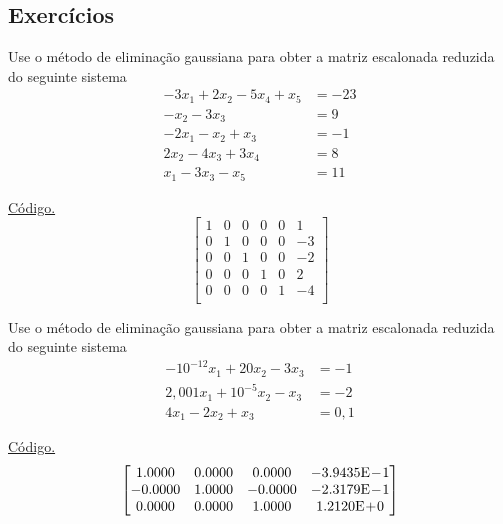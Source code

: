 \subsection*{Exercícios}

\begin{exer}\label{exer:egauss_reduzida}
  Use o método de eliminação gaussiana para obter a matriz escalonada reduzida do seguinte sistema
  \begin{align}
    -3x_1 + 2x_2 -5x_4 + x_5 &= -23\\
    -x_2 -3x_3 &= 9\\
    -2x_1 -x_2 + x_3 &= -1\\
    2x_2 - 4x_3 + 3x_4 &= 8\\
    x_1 - 3x_3 - x_5 &= 11
  \end{align}
\end{exer}
\begin{resp}
    \ifisoctave 
  \href{https://github.com/phkonzen/notas/blob/master/src/MatematicaNumerica/cap_sl_direto/dados/exer_egauss_reduzida/exer_egauss_reduzida.m}{Código.} 
  \fi
  $$
  \begin{bmatrix}
    1 & 0 & 0 & 0 & 0 & 1\\
    0 & 1 & 0 & 0 & 0 & -3\\
    0 & 0 & 1 & 0 & 0 & -2\\
    0 & 0 & 0 & 1 & 0 & 2\\
    0 & 0 & 0 & 0 & 1 & -4\\
  \end{bmatrix}
  $$
\end{resp}

\begin{exer}\label{exer:egauss_arredondamento}
  Use o método de eliminação gaussiana para obter a matriz escalonada reduzida do seguinte sistema
  \begin{align}
    -10^{-12}x_1 + 20x_2 - 3x_3 &= -1\\
    2,001x_1 + 10^{-5}x_2 - x_3 &= -2\\
    4x_1 - 2x_2 + x_3 &= 0,1
  \end{align}
\end{exer}
\begin{resp}
  \ifisoctave 
  \href{https://github.com/phkonzen/notas/blob/master/src/MatematicaNumerica/cap_sl_direto/dados/exer_egauss_arredondamento/exer_egauss_arredondamento.m}{Código.} 
  \fi
  $$
  \begin{bmatrix}
   1.0000 &  0.0000 &  0.0000 & -3.9435\mathrm{E}\!-\!1\\
  -0.0000 &  1.0000 & -0.0000 & -2.3179\mathrm{E}\!-\!1\\
   0.0000 &  0.0000 &  1.0000 &  1.2120\mathrm{E}\!+\!0
  \end{bmatrix}
  $$
\end{resp}

